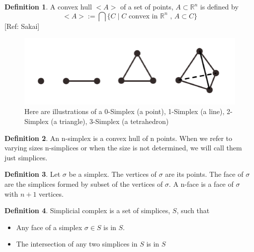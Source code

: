 \documentclass[12pt, a4paper, twocolumn, fullpage]{article}
\theoremstyle{plain}
\theoremstyle{definition}
\newtheorem{defn}{Definition}[section]
\theoremstyle{remark}
\begin{document}
\begin{defn}
A convex hull $<A>$ of a set of points, $A \subset \mathbb{R}^n$ is defined by 
$$<A> := \bigcap \{C \mid C \text{ convex in } \mathbb{R}^n \text{ , } A\subset C \} $$
[Ref: Sakai]
\end{defn}

\begin{figure}[t]
    \includegraphics[width=\linewidth]{img/mathDef/simplex.png}
    \caption{Here are illustrations of a 0-Simplex (a point), 1-Simplex (a line), 2-Simplex (a triangle), 3-Simplex (a tetrahedron)}
    \label{Simplex}
\end{figure}

\begin{defn}
An n-simplex is a convex hull of n points. When we refer to varying sizes n-simplices or when the size is not determined, we will call them just simplices.
\end{defn}

\begin{defn}
Let $\sigma$ be a simplex.
The vertices of $\sigma$ are its points.
The face of $\sigma$ are the simplices formed by subset of the vertices of $\sigma$.
A n-face is a face of $\sigma$ with $n+1$ vertices.
\end{defn}

\begin{defn}
Simplicial complex is a set of simplices, $S $, such that 
\begin{itemize}
    \item Any face of a simplex $\sigma \in S$ is in $S$.
    \item The intersection of any two simplices in $ S $ is in $ S $
\end{itemize}
\end{defn}
\end{document}
